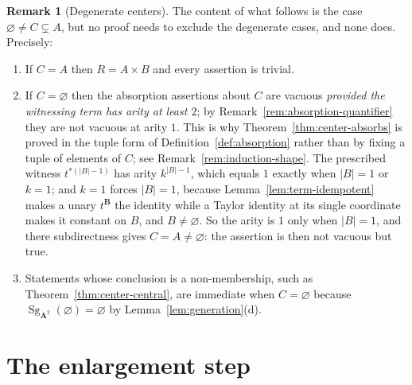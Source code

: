 \documentclass[11pt]{article}
\theoremstyle{mainplain}
\theoremstyle{mainroman}
\theoremstyle{definition}
\newtheorem{remark}[theorem]{Remark}
\newcommand{\alphlabels}{\renewcommand{\labelenumi}{\textup{(\alph{enumi})}}%
  \renewcommand{\theenumi}{\alph{enumi}}}
\providecommand{\tightlist}{\setlength{\itemsep}{0pt}\setlength{\parskip}{0pt}}
\numberwithin{equation}{section}
\DeclareMathOperator{\Sg}{Sg}
\newcommand{\bA}{\mathbf A}
\newcommand{\bB}{\mathbf B}
\begin{document}
\begin{remark}[Degenerate centers]\label{rem:degenerate-center}
The content of what follows is the case $\varnothing\ne C\subsetneq A$, but no
proof needs to exclude the degenerate cases, and none does. Precisely:
\begin{enumerate}\alphlabels\tightlist
\item If $C=A$ then $R=A\times B$ and every assertion is trivial.
\item If $C=\varnothing$ then the absorption assertions about $C$ are vacuous
      \emph{provided the witnessing term has arity at least $2$}; by
      Remark~\ref{rem:absorption-quantifier} they are not vacuous at arity $1$.
      This is why Theorem~\ref{thm:center-absorbs} is proved in the tuple form
      of Definition~\ref{def:absorption} rather than by fixing a tuple of
      elements of $C$; see Remark~\ref{rem:induction-shape}. The prescribed
      witness $t^{*(|B|-1)}$ has arity $k^{|B|-1}$, which equals $1$ exactly
      when $|B|=1$ or $k=1$; and $k=1$ forces $|B|=1$, because
      Lemma~\ref{lem:term-idempotent} makes a unary $t^{\bB}$ the identity
      while a Taylor identity at its single coordinate makes it constant on
      $B$, and $B\ne\varnothing$. So the arity is $1$ only when $|B|=1$, and
      there subdirectness gives $C=A\ne\varnothing$: the assertion is then not
      vacuous but true.
\item Statements whose conclusion is a non-membership, such as
      Theorem~\ref{thm:center-central}, are immediate when $C=\varnothing$
      because $\Sg_{\bA^2}(\varnothing)=\varnothing$ by
      Lemma~\ref{lem:generation}(d).
\end{enumerate}
\end{remark}

\section{The enlargement step}\label{sec:step}
\end{document}
